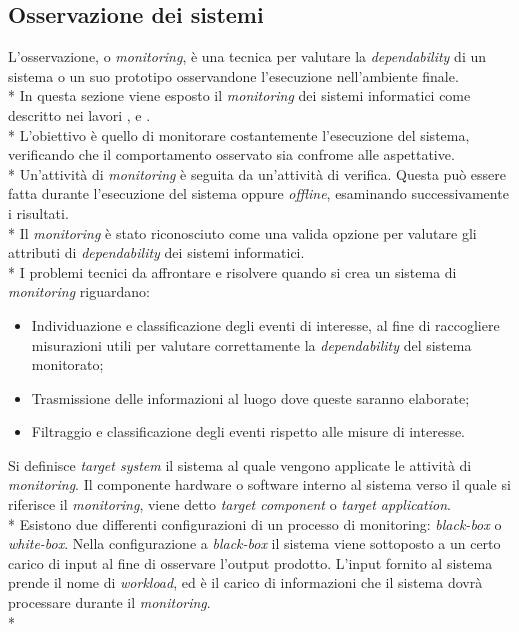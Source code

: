 \subsection{Osservazione dei sistemi}
L'osservazione, o \emph{monitoring}, \`e una tecnica per valutare la \emph{dependability} di un sistema o un suo prototipo osservandone l'esecuzione nell'ambiente finale.\\*
In questa sezione viene esposto il \emph{monitoring} dei sistemi informatici come descritto nei lavori \cite{monitor1}, \cite{monitor2} e \cite{monitor3}.\\*
L'obiettivo \`e quello di monitorare costantemente l'esecuzione del sistema, verificando che il comportamento osservato sia confrome alle aspettative.\\*
Un'attivit\`a di \emph{monitoring} \`e seguita da un'attivit\`a di verifica. Questa pu\`o essere fatta durante l'esecuzione del sistema oppure \emph{offline}, esaminando successivamente i risultati.\\*
Il \emph{monitoring} \`e stato riconosciuto come una valida opzione per valutare gli attributi di \emph{dependability} dei sistemi informatici.\\*
I problemi tecnici da affrontare e risolvere quando si crea un sistema di \emph{monitoring} riguardano:
\begin{itemize}
	\item Individuazione e classificazione degli eventi di interesse, al fine di raccogliere misurazioni utili per valutare correttamente la \emph{dependability} del sistema monitorato;
	\item Trasmissione delle informazioni al luogo dove queste saranno elaborate;
	\item Filtraggio e classificazione degli eventi rispetto alle misure di interesse.
\end{itemize}
Si definisce \emph{target system} il sistema al quale vengono applicate le attivit\`a di \emph{monitoring}. Il componente hardware o software interno al sistema verso il quale si riferisce il \emph{monitoring}, viene detto \emph{target component} o \emph{target application}.\\*
Esistono due differenti configurazioni di un processo di monitoring: \emph{black-box} o \emph{white-box}. Nella configurazione a \emph{black-box} il sistema viene sottoposto a un certo carico di input al fine di osservare l'output prodotto. L'input fornito al sistema prende il nome di \emph{workload}, ed \`e il carico di informazioni che il sistema dovr\`a processare durante il \emph{monitoring}.\\*
